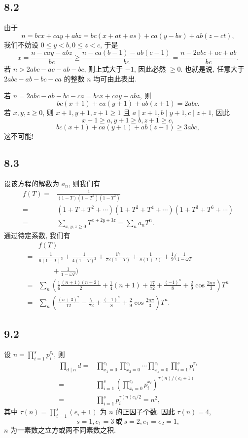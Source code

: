 \documentclass[12pt,a4paper,reqno]{amsart}
\theoremstyle{remark}
\renewcommand{\le}{\leqslant}
\begin{document}
\subsection*{8.2}
由于
  \[n=bcx+cay+abz=bc(x+at+as)+ca(y-bs)+ab(z-ct),\]
我们不妨设 $0\le y<b, 0\le z<c$, 于是
  \[x=\frac{n-cay-abz}{bc}\geqslant \frac{n-ca(b-1)-ab(c-1)}{bc}=\frac{n-2abc+ac+ab}{bc}.\]
若 $n>2abc-ac-ab-bc$, 则上式大于 $-1$, 因此必然 $\geqslant 0$. 也就是说, 任意大于 $2abc-ab-bc-ca$ 的整数 $n$ 均可由此表出.

若 $n=2abc-ab-bc-ca=bcx+cay+abz$, 则
  \[bc(x+1)+ca(y+1)+ab(z+1)=2abc.\]
若 $x,y,z\geqslant 0$, 则 $x+1,y+1,z+1\geqslant 1$ 且 $a\mid x+1,b\mid y+1,c\mid z+1$, 因此
  \[x+1\geqslant a,y+1\geqslant b,z+1\geqslant c,\]
  \[bc(x+1)+ca(y+1)+ab(z+1)\geqslant 3abc,\]
这不可能!

\subsection*{8.3}
设该方程的解数为 $a_n$, 则我们有
  \[\begin{split}
    f(T)=&\frac{1}{(1-T)(1-T^2)(1-T^3)}\\
        =&(1+T+T^2+\cdots)(1+T^2+T^4+\cdots)(1+T^3+T^6+\cdots)\\
        =&\sum_{x,y,z\geqslant 0} T^{x+2y+3z}=\sum_n a_nT^n.
  \end{split}\]
通过待定系数, 我们有
  \[\begin{split}
     &f(T)\\
    =&\frac{1}{6(1-T)^3}+\frac{1}{4(1-T)^2}+\frac{17}{72(1-T)}
        +\frac{1}{8(1+T)}+\frac{1}{9}(\frac{1}{1-\omega T}\\
     &\qquad {}+\frac{1}{1-\bar\omega T})\\
    =&\sum_{n} (\frac{1}{6}\frac{(n+1)(n+2)}{2}+\frac{1}{4}(n+1)+\frac{17}{72}
        +\frac{(-1)^n}{8}+\frac{2}{9}\cos\frac{2n\pi}{3})T^n\\
    =&\sum_n (\frac{(n+3)^2}{12}-\frac{7}{72}+\frac{(-1)^n}{8}+\frac{2}{9}\cos\frac{2n\pi}{3})T^n.
  \end{split}\]

\subsection*{9.2}
设 $n=\prod\limits_{i=1}^s p_i^{e_i}$, 则
  \[\begin{split}
  \prod_{d\mid n}d=&\prod_{x_1=0}^{e_1}\prod_{x_2=0}^{e_2}\cdots\prod_{x_s=0}^{e_s} \prod_{i=1}^s p_i^{x_i}\\
  =&\prod_{i=1}^s (\prod_{x_i=0}^{e_i} p_i^{x_i})^{\tau(n)/(e_i+1)}\\
  =&\prod_{i=1}^s p_i^{\tau(n)e_i/2}=n^2,
  \end{split}\]
其中 $\tau(n)=\prod\limits_{i=1}^s (e_i+1)$ 为 $n$ 的正因子个数. 因此 $\tau(n)=4$,
  \[ s=1,e_1=3\ \text{或}\ s=2,e_1=e_2=1,\]
$n$ 为一素数之立方或两不同素数之积.
\end{document}
